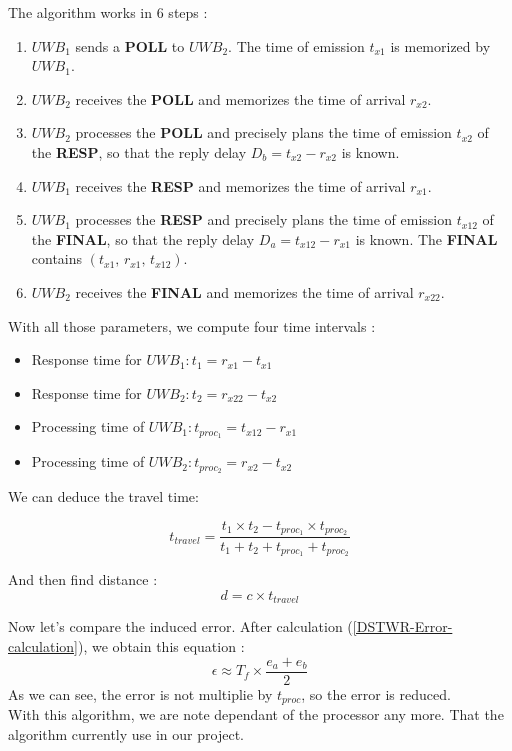 \noindent The algorithm works in 6 steps :  
\begin{enumerate}
    \item $UWB_1$ sends a \textbf{POLL} to $UWB_2$. The time of emission
          $t_{x1}$ is memorized by $UWB_1$.
    \item $UWB_2$ receives the \textbf{POLL} and memorizes the time of
          arrival $r_{x2}$.
    \item $UWB_2$ processes the \textbf{POLL} and precisely plans the time
          of emission $t_{x2}$ of the \textbf{RESP}, so that the reply
          delay $D_b = t_{x2} - r_{x2}$ is known.
    \item $UWB_1$ receives the \textbf{RESP} and memorizes the time of
          arrival $r_{x1}$.
    \item $UWB_1$ processes the \textbf{RESP} and precisely plans the time
          of emission $t_{x12}$ of the \textbf{FINAL}, so that the reply
          delay $D_a = t_{x12} - r_{x1}$ is known. The \textbf{FINAL}
          contains $(t_{x1},\, r_{x1},\, t_{x12})$.
    \item $UWB_2$ receives the \textbf{FINAL} and memorizes the time of
          arrival $r_{x22}$.
\end{enumerate}

\noindent With all those parameters, we compute four time intervals :
\begin{itemize}
    \item Response time for $UWB_1 : t_1 = r_{x1} - t_{x1}$
    \item Response time for $UWB_2 : t_2 = r_{x22} - t_{x2}$
    \item Processing time of $UWB_1 : t_{proc_1} = t_{x12} - r_{x1}$
    \item Processing time of $UWB_2 : t_{proc_2} = r_{x2} - t_{x2}$
\end{itemize}

\noindent We can deduce the travel time: 

\begin{equation}
\boxed{t_{travel} = \frac{t_1 \times t_2 - t_{proc_1} \times t_{proc_2}}{ t_1 +t_2+t_{proc_1}+t_{proc_2}}}
\end{equation}

\noindent And then find distance : 
 \begin{equation}
    d = c \times t_{travel}
\end{equation}         

\noindent Now let's compare the induced error. After calculation (\ref{DSTWR-Error-calculation}), we obtain this equation  : 
\begin{equation}
\epsilon \approx T_f \times \frac{e_a + e_b}{2}
\end{equation}
As we can see, the error is not multiplie by $t_{proc}$, so the error is reduced.\\
With this algorithm, we are note dependant of the processor any more. That the algorithm currently use in our project.

